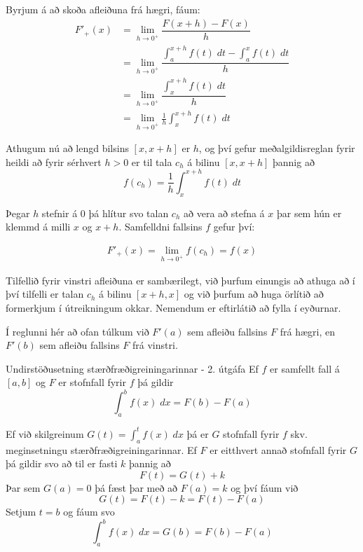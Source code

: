 \begin{sonnun}
Byrjum á að skoða afleiðuna frá hægri, fáum:
\begin{align*}
F'_{+}(x) &= \lim_{h \to 0^{+}} \dfrac{F(x+h)-F(x)}{h}\\ &= \lim_{h \to 0^{+}} \dfrac{\int_{a}^{x+h}f(t)\;dt - \int_{a}^{x}f(t)\;dt}{h}\\ &= \lim_{h \to 0^{+}} \dfrac{\int_{x}^{x+h}f(t)\;dt}{h}\\ &= \lim_{h \to 0^{+}} \frac{1}{h}\int_{x}^{x+h}f(t)\;dt
\end{align*}

Athugum nú að lengd bilsins $[x,x+h]$ er $h$, og því gefur meðalgildisreglan fyrir heildi að fyrir sérhvert $h>0$ er til tala $c_{h}$ á bilinu $[x,x+h]$ þannig að
$$
f\left(c_{h}\right) = \frac{1}{h}\int_{x}^{x+h}f(t)\;dt
$$

Þegar $h$ stefnir á $0$ þá hlítur svo talan $c_{h}$ að vera að stefna á $x$ þar sem hún er klemmd á milli $x$ og $x+h$. Samfelldni fallsins $f$ gefur því:

\begin{align*}
F'_{+}(x) = \lim_{h \to 0^{+}} f\left(c_{h}\right) = f(x) 
\end{align*}

Tilfellið fyrir vinstri afleiðuna er sambærilegt, við þurfum einungis að athuga að í því tilfelli er talan $c_h$ á bilinu $[x+h,x]$ og við þurfum að huga örlítið að formerkjum í útreikningum okkar. Nemendum er eftirlátið að fylla í eyðurnar.
\end{sonnun}

\begin{ath}
Í reglunni hér að ofan túlkum við $F'(a)$ sem afleiðu fallsins $F$ frá hægri, en $F'(b)$ sem afleiðu fallsins $F$ frá vinstri.
\end{ath}

\begin{regla}{Undirstöðusetning stærðfræðigreiningarinnar - 2. útgáfa}
Ef $f$ er samfellt fall á $[a,b]$ og $F$ er stofnfall fyrir $f$ þá gildir
$$
\int_{a}^{b}f(x)\;dx = F(b) - F(a)
$$
\end{regla}

\begin{sonnun}
Ef við skilgreinum $G(t) = \int_{a}^{t}f(x)\;dx$ þá er $G$ stofnfall fyrir $f$ skv. meginsetningu stærðfræðigreiningarinnar. Ef $F$ er eitthvert annað stofnfall fyrir $G$ þá gildir svo að til er fasti $k$ þannig að
$$
F(t) = G(t) + k
$$
Þar sem $G(a) = 0$ þá fæst þar með að $F(a) = k$ og því fáum við 
$$
G(t) = F(t) - k = F(t) - F(a)
$$
Setjum $t = b$ og fáum svo
$$
\int_{a}^{b} f(x)\;dx = G(b) = F(b)-F(a)
$$
\end{sonnun}

